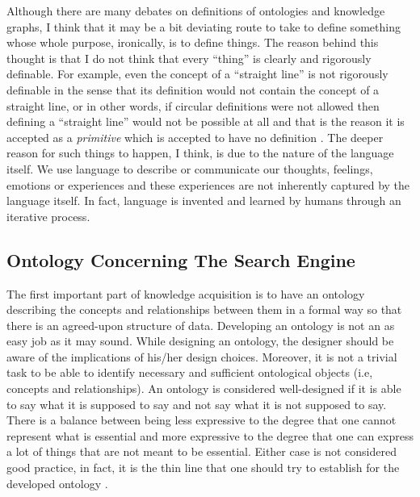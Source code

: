 Although there are many debates on definitions of ontologies and knowledge graphs, I think that it may 
be a bit deviating route to take to define something whose whole purpose, ironically, is to define things. 
The reason behind this thought is that I do not think that every ``thing'' is clearly and rigorously 
definable. For example, even the concept of a ``straight line'' is not rigorously definable in the 
sense 
that its definition would not contain the concept of a straight line, or in other words, if circular 
definitions were not allowed then defining a ``straight line'' would not be possible at all and that is 
the reason it is accepted as a \textit{primitive} which is accepted to have no definition 
\cite{enwiki:1092767429}. The deeper reason for such things to happen, I think, is due to the nature of 
the language itself. We use language to describe or communicate our thoughts, feelings, emotions or 
experiences and these experiences are not inherently captured by the language itself. In fact, language is 
invented and learned by humans through an iterative process.

\subsection{Ontology Concerning The Search Engine}

The first important part of knowledge acquisition is to have an ontology describing the concepts and 
relationships between them in a formal way so that there is an agreed-upon structure of data. Developing 
an ontology is not an as easy job as it may sound. While designing an ontology, the designer should be 
aware of the implications of his/her design choices. Moreover, it is not a trivial task to be able to 
identify necessary and sufficient ontological objects (i.e, concepts and relationships). An ontology is 
considered well-designed if it is able to say what it is supposed to say and not say what it is not 
supposed to say. There is a balance between being less expressive to the degree that one cannot 
represent what is essential and more expressive to the degree that one can express a lot of things that 
are not meant to be essential. Either case is not considered good practice, in fact, it is the thin 
line that one should try to establish for the developed ontology \cite{cmariakeet}.

